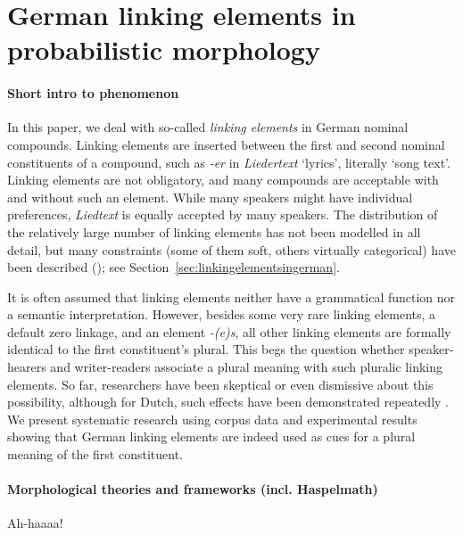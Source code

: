 \section{German linking elements in probabilistic morphology}
\label{sec:germanlinkingelementsinprobabilisticmorphology}

\paragraph{Short intro to phenomenon}

In this paper, we deal with so-called \textit{linking elements} in German nominal compounds.
Linking elements are inserted between the first and second nominal constituents of a compound, such as \textit{-er} in \textit{Liedertext} `lyrics', literally `song text'.
Linking elements are not obligatory, and many compounds are acceptable with and without such an element.
While many speakers might have individual preferences, \textit{Liedtext} is equally accepted by many speakers.
The distribution of the relatively large number of linking elements has not been modelled in all detail, but many constraints (some of them soft, others virtually categorical) have been described (\egg \citealt{Fuhrhop1996,Wegener2003,Schluecker2012,NueblingSzczepaniak2013,FuhrhopKuerschner2015}); see Section~\ref{sec:linkingelementsingerman}.

It is often assumed that linking elements neither have a grammatical function nor a semantic interpretation.
However, besides some very rare linking elements, a default zero linkage, and an element \textit{-(e)s}, all other linking elements are formally identical to the first constituent's plural.
This begs the question whether speaker-hearers and writer-readers associate a plural meaning with such pluralic linking elements.
So far, researchers have been skeptical or even dismissive about this possibility, although for Dutch, such effects have been demonstrated repeatedly \parencite{SchreuderEa1998,BangaEa2012,BangaEa2013a,BangaEa2013b}.
We present systematic research using corpus data and experimental results showing that German linking elements are indeed used as cues for a plural meaning of the first constituent.

\paragraph{Morphological theories and frameworks (incl. Haspelmath)}

Ah-haaaa!

